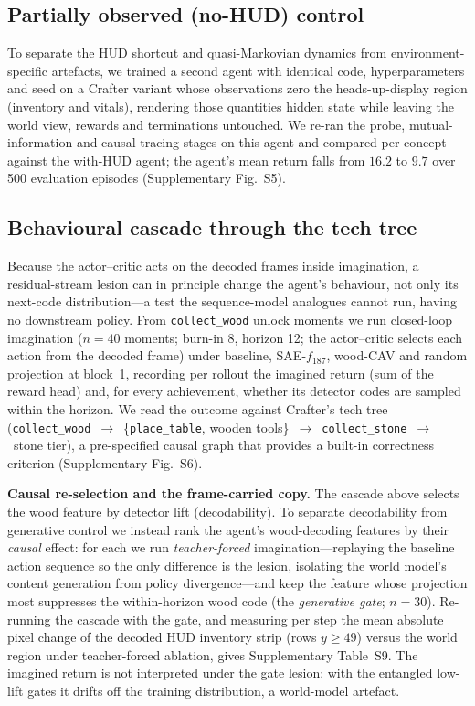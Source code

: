 \documentclass[pdflatex,sn-mathphys-num]{sn-jnl}%
\theoremstyle{thmstyleone}%
\theoremstyle{thmstyletwo}%
\theoremstyle{thmstylethree}%
\newcommand{\achname}[1]{\texttt{#1}}
\begin{document}
\subsection{Partially observed (no-HUD) control}\label{m:nohud}
To separate the HUD shortcut and quasi-Markovian dynamics from environment-specific artefacts, we trained a second agent with identical code, hyperparameters and seed on a Crafter variant whose observations zero the heads-up-display region (inventory and vitals), rendering those quantities hidden state while leaving the world view, rewards and terminations untouched. We re-ran the probe, mutual-information and causal-tracing stages on this agent and compared per concept against the with-HUD agent; the agent's mean return falls from $16.2$ to $9.7$ over 500 evaluation episodes (Supplementary Fig.~S5).

\subsection{Behavioural cascade through the tech tree}\label{m:cascade}
Because the actor--critic acts on the decoded frames inside imagination, a residual-stream lesion can in principle change the agent's behaviour, not only its next-code distribution---a test the sequence-model analogues cannot run, having no downstream policy. From \achname{collect\_wood} unlock moments we run closed-loop imagination ($n{=}40$ moments; burn-in 8, horizon 12; the actor--critic selects each action from the decoded frame) under baseline, SAE-$f_{187}$, wood-CAV and random projection at block~1, recording per rollout the imagined return (sum of the reward head) and, for every achievement, whether its detector codes are sampled within the horizon. We read the outcome against Crafter's tech tree (\achname{collect\_wood}~$\to$~\{\achname{place\_table}, wooden tools\}~$\to$~\achname{collect\_stone}~$\to$~stone tier), a pre-specified causal graph that provides a built-in correctness criterion (Supplementary Fig.~S6).

\textbf{Causal re-selection and the frame-carried copy.} The cascade above selects the wood feature by detector lift (decodability). To separate decodability from generative control we instead rank the agent's wood-decoding features by their \emph{causal} effect: for each we run \emph{teacher-forced} imagination---replaying the baseline action sequence so the only difference is the lesion, isolating the world model's content generation from policy divergence---and keep the feature whose projection most suppresses the within-horizon wood code (the \emph{generative gate}; $n{=}30$). Re-running the cascade with the gate, and measuring per step the mean absolute pixel change of the decoded HUD inventory strip (rows $y\ge49$) versus the world region under teacher-forced ablation, gives Supplementary Table~S9. The imagined return is not interpreted under the gate lesion: with the entangled low-lift gates it drifts off the training distribution, a world-model artefact.
\end{document}
